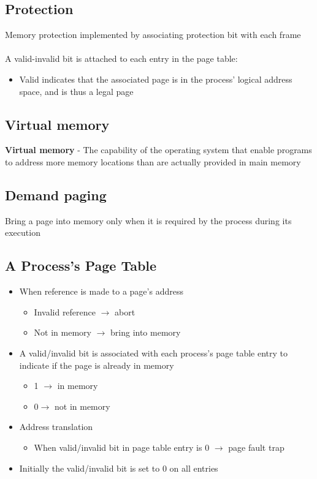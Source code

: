 \documentclass{article}[18pt]
\begin{document}
\subsection{Protection}
Memory protection implemented by associating protection bit with each frame\\
\\
A valid-invalid bit is attached to each entry in the page table:
\begin{itemize}
	\item Valid indicates that the associated page is in the process' logical address space, and is thus a legal page
\end{itemize}
\subsection{Virtual memory}
\textbf{Virtual memory} - The capability of the operating system that enable programs to address more memory locations than are actually provided in main memory
\subsection{Demand paging}
Bring a page into memory only when it is required by the process during its execution
\subsection{A Process's Page Table}
\begin{itemize}
	\item When reference is made to a page's address
	\begin{itemize}
		\item Invalid reference $\rightarrow$ abort
		\item Not in memory $\rightarrow$ bring into memory
	\end{itemize}
	\item A valid/invalid bit is associated with each process's page table entry to indicate if the page is already in memory
	\begin{itemize}
		\item 1 $\rightarrow$ in memory
		\item $0 \rightarrow$ not in memory
	\end{itemize}
	\item Address translation
	\begin{itemize}
		\item When valid/invalid bit in page table entry is 0 $\rightarrow$ page fault trap
	\end{itemize}
	\item Initially the valid/invalid bit is set to 0 on all entries
\end{itemize}
\end{document}

